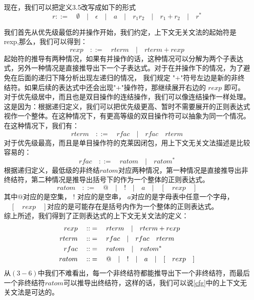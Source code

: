 \documentclass[openany,oneside]{book}
\theoremstyle{definition}
\theoremstyle{definition}
\begin{document}
	现在，我们可以把定义3.5改写成如下的形式
	\begin{equation}
		r::= \quad \emptyset \quad| \quad\epsilon\quad |\quad a \quad  |\quad r_1 r_2\quad |\quad r_1 + r_2\quad | \quad r^*
	\end{equation}
	
	我们首先从优先级最低的并操作开始，我们约定，上下文无关文法的起始符是rexp,那么，我们可以得到：
	\begin{equation}
		rexp \quad::=\quad rterm\quad  | \quad rterm + rexp
	\end{equation}
	\indent 起始符的推导有两种情况，如果有并操作的话，这种情况可以分解为两个子表达式，另外一种情况是直接推导出下一个子表达式。对于在并操作下的情况，为了避免在后面的递归下降分析出现左递归的情况， 我们规定 "$+$"符号左边是新的非终结符。如果后续的表达式中还会出现"$+$"操作符，那继续展开右边的 $rexp$ 即可。\\
	\indent 对于优先级居中，而且也是双目操作的连结操作，我们可以像连结操作一样处理。这是因为：根据递归定义，我们可以把优先级更高、暂时不需要展开的正则表达式视作一个整体。在这种情况下，有更高等级的双目操作符可以抽象为同一个情况。在这种情况下，我们有：
	\begin{equation}
		rterm\quad::=\quad rfac\quad | \quad rfac\quad rterm
	\end{equation}
	\indent 对于优先级最高，而且是单目操作符的克莱因闭包，用上下文无关文法描述是比较容易的：
	\begin{equation}
		rfac\quad::=\quad ratom \quad | \quad ratom^* 
	\end{equation}
	\indent 根据递归定义，最低级的非终结$ratom$对应两种情况，第一种情况是直接推导出非终结符，第二种情况是推导出括号下的作为一个整体的正则表达式。
	\begin{equation}
		ratom\quad::=\quad @ \quad | \quad ! \quad |\quad a \quad | \quad[\quad rexp \quad]
	\end{equation}
	\indent 其中$@$对应的是空集， $!$ 对应的是空串， $a$对应的是字母表中任意一个字母， $\quad[\quad rexp \quad]$对应的是可能存在是括号内作为一个整体的正则表达式。 \\
	\indent 综上所述，我们得到了正则表达式的上下文无关文法的定义：
	\begin{equation}\label{cfg}
		\begin{split}
			rexp \quad::&=\quad rterm\quad  | \quad rterm + rexp \hfill  \\
			rterm\quad::&=\quad rfac\quad | \quad rfac\quad rterm \hfill  \\
			rfac\quad::&=\quad ratom \quad | \quad ratom^* \hfill \\
			ratom\quad::&=\quad @ \quad | \quad ! \quad |\quad a \quad | \quad[\quad rexp \quad] \hfill 
		\end{split}
	\end{equation}
	\indent 从\(\left( 3-6\right) \)中我们不难看出，每一个非终结符都能推导出下一个非终结符，而最后一个非终结符$ratom$可以推导出终结符，这样的话，我们可以说\ref{cfg}中的上下文无关文法是可达的。
	
\end{document}
